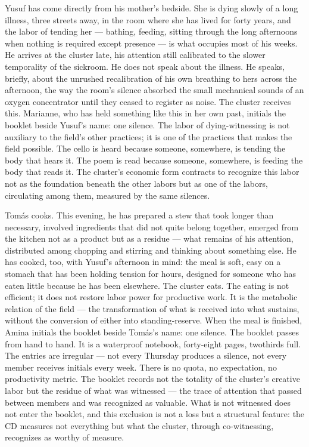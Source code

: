 Yusuf has come directly from his mother's bedside. She is dying slowly of a long illness, three streets away, in the room where she has lived for forty years, and the labor of tending her --- bathing, feeding, sitting through the long afternoons when nothing is required except presence --- is what occupies most of his weeks. He arrives at the cluster late, his attention still calibrated to the slower temporality of the sickroom. He does not speak about the illness. He speaks, briefly, about the unrushed recalibration of his own breathing to hers across the afternoon, the way the room's silence absorbed the small mechanical sounds of an oxygen concentrator until they ceased to register as noise. The cluster receives this. Marianne, who has held something like this in her own past, initials the booklet beside Yusuf's name: one silence. The labor of dying-witnessing is not auxiliary to the field's other practices; it is one of the practices that makes the field possible. The cello is heard because someone, somewhere, is tending the body that hears it. The poem is read because someone, somewhere, is feeding the body that reads it. The cluster's economic form contracts to recognize this labor not as the foundation beneath the other labors but as one of the labors, circulating among them, measured by the same silences.

Tomás cooks. This evening, he has prepared a stew that took longer than necessary, involved ingredients that did not quite belong together, emerged from the kitchen not as a product but as a residue --- what remains of his attention, distributed among chopping and stirring and thinking about something else. He has cooked, too, with Yusuf's afternoon in mind: the meal is soft, easy on a stomach that has been holding tension for hours, designed for someone who has eaten little because he has been elsewhere. The cluster eats. The eating is not efficient; it does not restore labor power for productive work. It is the metabolic relation of the field — the transformation of what is received into what sustains, without the conversion of either into standing-reserve. When the meal is finished, Amina initials the booklet beside Tomás’s name: one silence. The booklet passes from hand to hand. It is a waterproof notebook, forty-eight pages, twothirds full. The entries are irregular — not every Thursday produces a silence, not every member receives initials every week. There is no quota, no expectation, no productivity metric. The booklet records not the totality of the cluster’s creative labor but the residue of what was witnessed — the trace of attention that passed between members and was recognized as valuable. What is not witnessed does not enter the booklet, and this exclusion is not a loss but a structural feature: the CD measures not everything but what the cluster, through co-witnessing, recognizes as worthy of measure.

